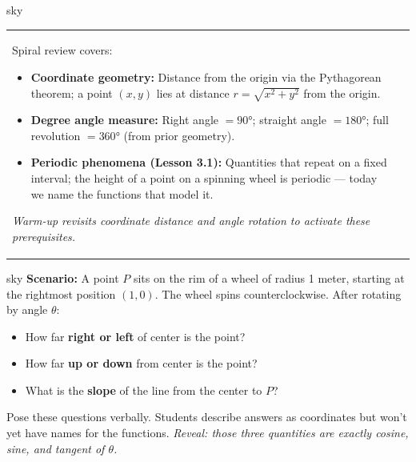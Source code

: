 \documentclass[10pt]{article}
\begin{document}
\begin{skillbox}{sky}
  \begin{tabularx}{\linewidth}{@{}X c@{}}
    \begin{minipage}[t]{0.90\linewidth}\vspace{0pt}
      Spiral review covers:
      \begin{itemize}[leftmargin=1.4em, itemsep=2pt]
        \item \textbf{Coordinate geometry:} Distance from the origin via the Pythagorean theorem;
              a point $(x,y)$ lies at distance $r = \sqrt{x^2+y^2}$ from the origin.
        \item \textbf{Degree angle measure:} Right angle $= 90°$; straight angle $= 180°$; full
              revolution $= 360°$ (from prior geometry).
        \item \textbf{Periodic phenomena (Lesson 3.1):} Quantities that repeat on a fixed interval;
              the height of a point on a spinning wheel is periodic --- today we name the functions
              that model it.
      \end{itemize}
      \textit{Warm-up revisits coordinate distance and angle rotation to activate these prerequisites.}
    \end{minipage}
    &
    \begin{minipage}[t]{0.05\linewidth}\vspace{0pt}
    \end{minipage}
  \end{tabularx}
\end{skillbox}

\vspace{6pt}

\begin{skillbox}[Hook]{sky}
  \textbf{Scenario:} A point $P$ sits on the rim of a wheel of radius 1 meter, starting at the
  rightmost position $(1, 0)$. The wheel spins counterclockwise. After rotating by angle $\theta$:
  \begin{itemize}[leftmargin=1.4em, itemsep=2pt]
    \item How far \textbf{right or left} of center is the point?
    \item How far \textbf{up or down} from center is the point?
    \item What is the \textbf{slope} of the line from the center to $P$?
  \end{itemize}
  Pose these questions verbally. Students describe answers as coordinates but won't yet have names
  for the functions. \textit{Reveal: those three quantities are exactly cosine, sine, and tangent of $\theta$.}
\end{skillbox}
\end{document}
